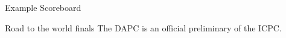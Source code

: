 \documentclass[11pt,pdf, aspectratio=169]{beamer}
\begin{document}
  {
    \begin{frame}{Example Scoreboard}
    \end{frame}
  }
  \begin{frame}{Road to the world finals}
    The DAPC is an official preliminary of the ICPC.
    
  \end{frame}
\end{document}
